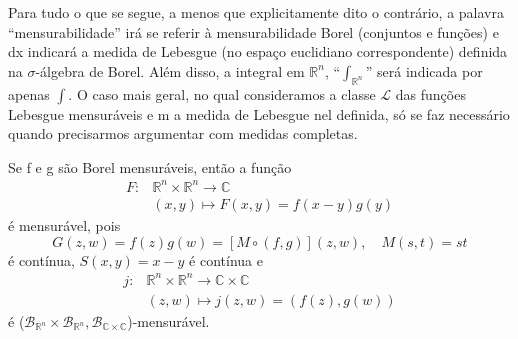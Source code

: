 \documentclass[../distribution_theory_notes.tex]{subfiles}
\begin{document}
Para tudo o que se segue, a menos que explicitamente dito o contrário, a palavra ``mensurabilidade'' irá se referir à mensurabilidade Borel (conjuntos e funções) e dx indicará a medida de Lebesgue (no espaço euclidiano correspondente) definida na \(\sigma \)-álgebra de Borel. Além disso, a integral em \(\mathbb{R}^{n}\), ``\(\int_{\mathbb{R}^{n}}^{}\)'' será indicada por apenas \(\int\).
O caso mais geral, no qual consideramos a classe \(\mathcal{L}\) das funções Lebesgue mensuráveis e m a medida de Lebesgue nel definida, só se faz necessário quando precisarmos argumentar com medidas completas.
\begin{tcolorbox}[
		skin=enhanced,
		title=Observação,
		fonttitle=\bfseries,
		colframe=black,
		colbacktitle=cyan!75!white,
		colback=cyan!15,
		colbacklower=black,
		coltitle=black,
		drop fuzzy shadow,
	]
	Se f e g são Borel mensuráveis, então a função
	\begin{align*}
		F: & \mathbb{R}^{n}\times \mathbb{R}^{n}\rightarrow \mathbb{C} \\
		   & (x, y)\longmapsto F(x,y)=f(x-y)g(y)
	\end{align*}
	é mensurável, pois
	\[
		G(z, w)=f(z)g(w) = [M \circ (f, g)](z, w),\quad M(s, t)=st
	\]
	é contínua, \(S(x, y)=x-y\) é contínua e
	\begin{align*}
		j: & \mathbb{R}^{n}\times \mathbb{R}^{n}\rightarrow \mathbb{C}\times \mathbb{C} \\
		   & (z, w)\longmapsto j(z, w)= (f(z), g(w))
	\end{align*}
	é (\(\mathcal{B}_{\mathbb{R}^{n}}\times \mathcal{B}_{\mathbb{R}^{n}}, \mathcal{B}_{\mathbb{C}\times \mathbb{C}}\))-mensurável.
\end{tcolorbox}
\end{document}
